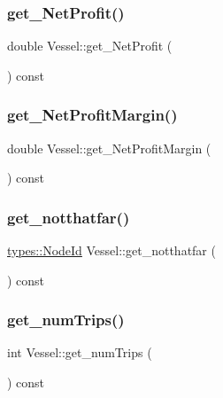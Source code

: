 \mbox{\label{class_vessel_aa9ce440519042c9a77d381d49a1be704}} 
\subsubsection{\texorpdfstring{get\_NetProfit()}{get\_NetProfit()}}
{\footnotesize\ttfamily double Vessel\+::get\+\_\+\+Net\+Profit (\begin{DoxyParamCaption}{ }\end{DoxyParamCaption}) const}

\mbox{\label{class_vessel_a02e543852118b7408402a988154bba6c}} 
\subsubsection{\texorpdfstring{get\_NetProfitMargin()}{get\_NetProfitMargin()}}
{\footnotesize\ttfamily double Vessel\+::get\+\_\+\+Net\+Profit\+Margin (\begin{DoxyParamCaption}{ }\end{DoxyParamCaption}) const}

\mbox{\label{class_vessel_aecfade094496d94900ff684c4880c6ac}} 
\subsubsection{\texorpdfstring{get\_notthatfar()}{get\_notthatfar()}}
{\footnotesize\ttfamily \mbox{\hyperlink{classtypes_1_1_node_id}{types\+::\+Node\+Id}} Vessel\+::get\+\_\+notthatfar (\begin{DoxyParamCaption}{ }\end{DoxyParamCaption}) const}

\mbox{\label{class_vessel_a34179609180708e8e1b11460ac14bca0}} 
\subsubsection{\texorpdfstring{get\_numTrips()}{get\_numTrips()}}
{\footnotesize\ttfamily int Vessel\+::get\+\_\+num\+Trips (\begin{DoxyParamCaption}{ }\end{DoxyParamCaption}) const}

